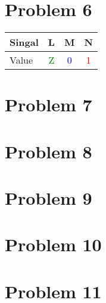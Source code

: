 \documentclass[paper=a4, fontsize=11pt]{scrartcl} %
\numberwithin{equation}{section} %
\numberwithin{figure}{section} %
\numberwithin{table}{section} %
\begin{document}

\section{Problem 6}
\center
\begin{tabular}{l || c | c | c}
	Singal & L & M & N \\ \hline
	Value & \textcolor{green}{Z} & \textcolor{blue}{0} & \textcolor{red}{1} \\
\end{tabular}


\section{Problem 7}


\section{Problem 8}


\section{Problem 9}


\section{Problem 10}


\section{Problem 11}
\end{document}
